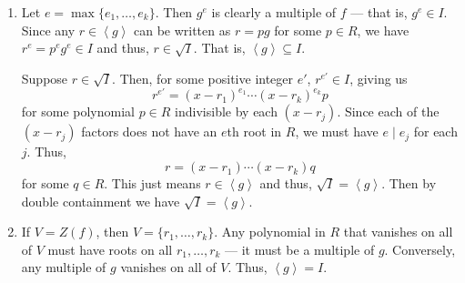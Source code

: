\documentclass[12 pt, letterpaper]{hmcpset}
\begin{document}
\begin{solution}
	\begin{enumerate}
		\item Let $e = \max \{ e_{1}, \dots, e_{k} \}$. Then $g^{e}$ is clearly a multiple of $f$ --- that is,  $g^{e} \in I$. Since any $r \in \left < g \right >$ can be written as $r = p g$ for some $p \in R$, we have $r^{e} = p^{e} g^{e} \in I$ and thus, $r \in \sqrt{I}$. That is, $\left < g \right > \subseteq I$.

			Suppose $r \in \sqrt{I}$. Then, for some positive integer $e'$, $r^{e'} \in I$, giving us
			\[
				r^{e'} = (x - r_{1})^{e_{1}} \cdots (x - r_{k})^{e_{k}} p
			\]
			for some polynomial $p \in R$ indivisible by each $(x - r_{j})$. Since each of the $(x - r_{j})$ factors does not have an $e$th root in $R$, we must have $e \mid e_{j}$ for each $j$. Thus,
			\[
				r = (x - r_{1}) \cdots (x - r_{k}) q
			\]
			for some $q \in R$. This just means $r \in \left < g \right >$ and thus, $\sqrt{I} = \left < g \right >$. Then by double containment we have $\sqrt{I} = \left < g \right >$.
		\item If $V = Z(f)$, then $V = \{ r_{1}, \dots, r_{k} \}$. Any polynomial in $R$ that vanishes on all of $V$ must have roots on all $r_{1}, \dots, r_{k}$ --- it must be a multiple of $g$. Conversely, any multiple of $g$ vanishes on all of $V$. Thus, $\left < g \right > = I$.
	\end{enumerate}
\end{solution}
\end{document}
